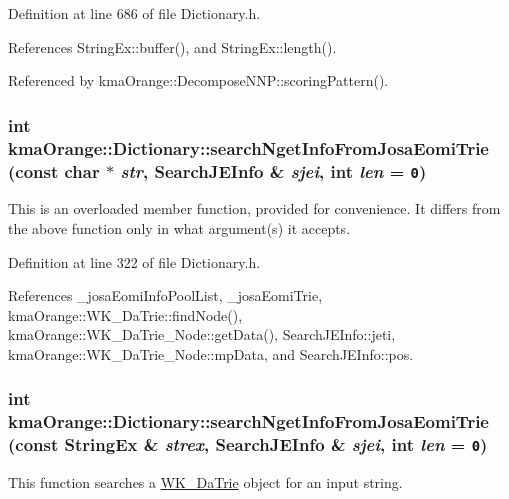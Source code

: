 Definition at line 686 of file Dictionary.h.

References StringEx::buffer(), and StringEx::length().

Referenced by kmaOrange::DecomposeNNP::scoringPattern().\hypertarget{classkmaOrange_1_1Dictionary_6236281c1997bd9f804082ba5647d12f}{
\subsubsection[{searchNgetInfoFromJosaEomiTrie}]{\setlength{\rightskip}{0pt plus 5cm}int kmaOrange::Dictionary::searchNgetInfoFromJosaEomiTrie (const char $\ast$ {\em str}, \/  {\bf SearchJEInfo} \& {\em sjei}, \/  int {\em len} = {\tt 0})}}
\label{classkmaOrange_1_1Dictionary_6236281c1997bd9f804082ba5647d12f}


This is an overloaded member function, provided for convenience. It differs from the above function only in what argument(s) it accepts. 

Definition at line 322 of file Dictionary.h.

References \_\-josaEomiInfoPoolList, \_\-josaEomiTrie, kmaOrange::WK\_\-DaTrie::findNode(), kmaOrange::WK\_\-DaTrie\_\-Node::getData(), SearchJEInfo::jeti, kmaOrange::WK\_\-DaTrie\_\-Node::mpData, and SearchJEInfo::pos.\hypertarget{classkmaOrange_1_1Dictionary_750713534498c4d0676232a153d58593}{
\subsubsection[{searchNgetInfoFromJosaEomiTrie}]{\setlength{\rightskip}{0pt plus 5cm}int kmaOrange::Dictionary::searchNgetInfoFromJosaEomiTrie (const {\bf StringEx} \& {\em strex}, \/  {\bf SearchJEInfo} \& {\em sjei}, \/  int {\em len} = {\tt 0})}}
\label{classkmaOrange_1_1Dictionary_750713534498c4d0676232a153d58593}


This function searches a \hyperlink{classkmaOrange_1_1WK__DaTrie}{WK\_\-DaTrie} object for an input string. 

